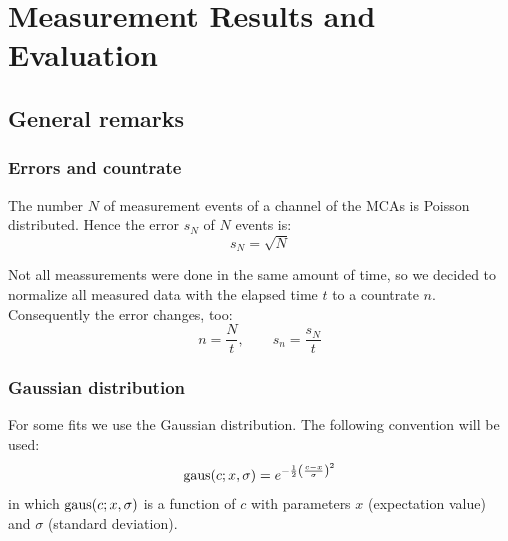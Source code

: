 \section{Measurement Results and Evaluation}

\subsection{General remarks}
\subsubsection{Errors and countrate}
The number $N$ of measurement events of a channel of the MCAs is Poisson distributed. Hence the error $s_N$  of $N$ events is:
\begin{equation}
  s_N = \sqrt{N}
\end{equation}

Not all meassurements were done in the same amount of time, so we decided to normalize all measured data with the elapsed time $t$ to a 
countrate $n$. Consequently the error changes, too:
\begin{equation}
    n = \frac{N}{t}, \qquad s_n = \frac{s_N}{t}
\end{equation}
\subsubsection{Gaussian distribution}
For some fits we use the Gaussian distribution. The following convention will be used:
\begin{equation}
	\label{eq:gaus}
    \operatorname{gaus}(c;x,\sigma) = e^{-\frac{1}{2} \left( \frac{c-x}{\sigma} \right)^2}
\end{equation}
in which $\operatorname{gaus}(c;x,\sigma)$ is a function of $c$ with parameters $x$ (expectation value) and $\sigma$ (standard deviation).

